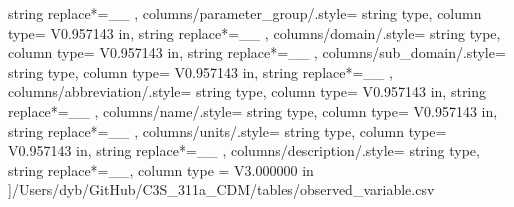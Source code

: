 \begin{landscape}
{            string replace*={_}{\_}
        },
    columns/parameter_group/.style={
            string type, 
            column type= V{0.957143 in}, 
            string replace*={_}{\_}
        },
    columns/domain/.style={
            string type, 
            column type= V{0.957143 in}, 
            string replace*={_}{\_}
        },
    columns/sub_domain/.style={
            string type, 
            column type= V{0.957143 in}, 
            string replace*={_}{\_}
        },
    columns/abbreviation/.style={
            string type, 
            column type= V{0.957143 in}, 
            string replace*={_}{\_}
        },
    columns/name/.style={
            string type, 
            column type= V{0.957143 in}, 
            string replace*={_}{\_}
        },
    columns/units/.style={
            string type, 
            column type= V{0.957143 in}, 
            string replace*={_}{\_}
        },
    columns/description/.style={
            string type, 
            string replace*={_}{\_},
            column type = V{3.000000 in}
        }
    ]{/Users/dyb/GitHub/C3S_311a_CDM/tables/observed_variable.csv}
\end{landscape}
